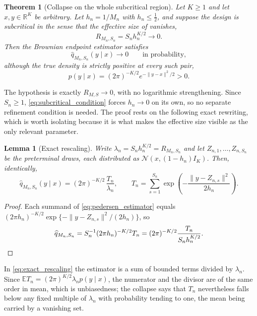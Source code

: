 \documentclass[11pt]{article}
\newtheorem{theorem}{Theorem}[section]
\newtheorem{lemma}[lemma]{Lemma}
\theoremstyle{definition}
\newcommand{\R}{\mathbb{R}}
\newcommand{\E}{\mathbb{E}}
\newcommand{\Normal}{\mathcal{N}}
\begin{document}
\begin{theorem}[Collapse on the whole subcritical region]\label{thm:subcritical}
Let $K\ge1$ and let $x,y\in\R^K$ be arbitrary. Let $h_n=1/M_n$ with $h_n\le\tfrac12$, and suppose the design is subcritical in the sense that the effective size of  vanishes,
\begin{equation}\label{eq:subcritical_condition}
R_{M_n,S_n}=S_nh_n^{K/2}\longrightarrow0 .
\end{equation}
Then the Brownian endpoint estimator satisfies
\begin{equation}\label{eq:collapse}
\widehat q_{M_n,S_n}(y\mid x)\longrightarrow0
\qquad\text{in probability},
\end{equation}
although the true density is strictly positive at every such pair,
\[
p(y\mid x)=(2\pi)^{-K/2}e^{-\lVert y-x\rVert^2/2}>0 .
\]
\end{theorem}

The hypothesis is exactly $R_{M,S}\to0$, with no logarithmic strengthening. Since $S_n\ge1$, \eqref{eq:subcritical_condition} forces $h_n\to0$ on its own, so no separate refinement condition is needed. The proof rests on the following exact rewriting, which is worth isolating because it is what makes the effective size visible as the only relevant parameter.

\begin{lemma}[Exact rescaling]\label{lem:exact_rescaling}
Write $\lambda_n=S_nh_n^{K/2}=R_{M_n,S_n}$ and let $Z_{n,1},\ldots,Z_{n,S_n}$ be the preterminal draws, each distributed as $\Normal(x,(1-h_n)I_K)$. Then, identically,
\begin{equation}\label{eq:exact_rescaling}
\widehat q_{M_n,S_n}(y\mid x)
=(2\pi)^{-K/2}\,\frac{T_n}{\lambda_n},
\qquad
T_n=\sum_{s=1}^{S_n}\exp\!\left(-\frac{\lVert y-Z_{n,s}\rVert^2}{2h_n}\right).
\end{equation}
\end{lemma}

\begin{proof}
Each summand of \eqref{eq:pedersen_estimator} equals
$(2\pi h_n)^{-K/2}\exp\{-\lVert y-Z_{n,s}\rVert^2/(2h_n)\}$, so
\[
\widehat q_{M_n,S_n}
=S_n^{-1}(2\pi h_n)^{-K/2}T_n
=(2\pi)^{-K/2}\frac{T_n}{S_nh_n^{K/2}} . \qedhere
\]
\end{proof}

In \eqref{eq:exact_rescaling} the estimator is a sum of bounded terms divided by $\lambda_n$. Since $\E T_n=(2\pi)^{K/2}\lambda_np(y\mid x)$, the numerator and the divisor are of the same order in mean, which is unbiasedness; the collapse says that $T_n$ nevertheless falls below any fixed multiple of $\lambda_n$ with probability tending to one, the mean being carried by a vanishing set.
\end{document}
